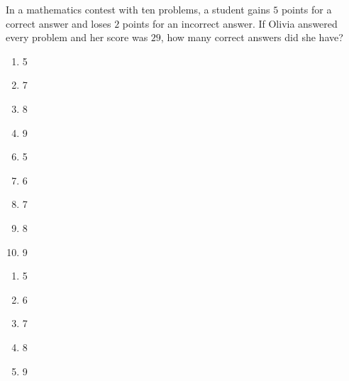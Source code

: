 In a mathematics contest with ten problems, a student gains $5$ points for a correct answer and loses $2$ points for an incorrect answer. If Olivia answered every problem and her score was $29$, how many correct answers did she have?


\ifsat
	\begin{enumerate}[label=\Alph*)]
		\item 5
		\item 7%
		\item 8 
		\item 9
	\end{enumerate}
\else
\fi

\ifacteven
	\begin{enumerate}[label=\textbf{\Alph*.},itemsep=\fill,align=left]
		\setcounter{enumii}{5}
		\item 5
		\item 6
		\item 7%
		\addtocounter{enumii}{1}
		\item 8 
		\item 9
	\end{enumerate}
\else
\fi

\ifactodd
	\begin{enumerate}[label=\textbf{\Alph*.},itemsep=\fill,align=left]
		\item 5
		\item 6
		\item 7%
		\item 8 
		\item 9
	\end{enumerate}
\else
\fi

%
		
\else
\fi

